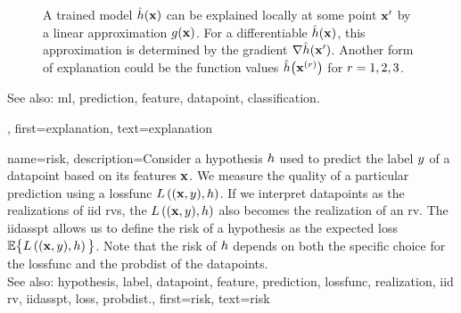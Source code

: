 {{\begin{figure}[H]
\begin{center}
	 	\end{center}
	 	\caption{A trained \gls{model} $\hat{h}({\bf x})$ can be explained 
	     	locally at some point ${\bf x}'$ by a linear approximation $g({\bf x})$. 
	     	For a \gls{differentiable} $\hat{h}({\bf x})$, this approximation is 
	     	determined by the \gls{gradient} $\nabla \hat{h}({\bf x}')$. Another 
	     	form of explanation could be the \gls{function} values $\hat{h}\big({\bf x}^{(r)} \big)$ 
	     	for $r=1, 2, 3$. 
		\label{fig_explanation_dict}}
	 	\end{figure} 
		See also: \gls{ml}, \gls{prediction}, \gls{feature}, \gls{datapoint}, \gls{classification}.},
	first={explanation},
	text={explanation} 
}

{name={risk},
	description={Consider a \gls{hypothesis} $h$ used to predict the \gls{label} 
		$y$ of a \gls{datapoint} based on its \glspl{feature} ${\bf x}$. We measure 
		the quality of a particular \gls{prediction} using a \gls{lossfunc} $L\left(({\bf x},y),h \right)$. 
		If we interpret \glspl{datapoint} as the \glspl{realization} of \gls{iid} \glspl{rv}, 
		the $L\left(({\bf x},y),h \right)$ also becomes the \gls{realization} 
		of an \gls{rv}. The \gls{iidasspt} allows us to define the risk of a \gls{hypothesis} 
		as the expected \gls{loss} $\mathbb{E} \big\{L\left(({\bf x},y),h \right) \big\}$. 
		Note that the risk of $h$ depends on both the specific choice for the \gls{lossfunc} and the 
		\gls{probdist} of the \glspl{datapoint}.
					\\ 
		See also: \gls{hypothesis}, \gls{label}, \gls{datapoint}, \gls{feature}, \gls{prediction}, \gls{lossfunc}, \gls{realization}, \gls{iid} \gls{rv}, \gls{iidasspt}, \gls{loss}, \gls{probdist}.},
	first={risk},
	text={risk} 
}

